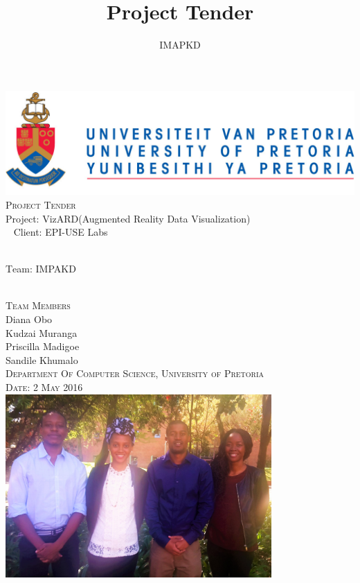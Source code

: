 \documentclass[a4paper,12pt]{article}
\author{IMAPKD}
\title{ Project Tender}
\begin{document}
\setlength{\parskip}{6pt}

\begin{titlepage}

\begin{center}
\includegraphics[width=1\textwidth]{./University_of_Pretoria_Logo.PNG}\\[0.4cm]    
\textsc{\Large Project Tender}\\[0.5cm]

{ \huge \textsc Project: VizARD(Augmented Reality Data Visualization) }\\[0.4cm]\
{ \huge \textsc Client: EPI-USE Labs  }\\[0.1cm]\

{ \huge \textsc Team: IMPAKD  }\\[0.1cm]\

\textsc{\Large Team Members}\\[0.3cm]

{\Large Diana {Obo}} \\[0.3cm]

{\Large Kudzai {Muranga}} \\[0.3cm]

{\Large Priscilla {Madigoe}}\\[0.3cm]

{\Large Sandile {Khumalo}}\\[0.5cm]

\textsc{ Department Of Computer Science, University of Pretoria}\\[0.3cm]
\textsc{Date: 2 May 2016}\\[0.3cm]

\includegraphics[width=4in]{./IMAPKD.jpg}

\vfill
\end{center}
\end{titlepage}
\end{document}
